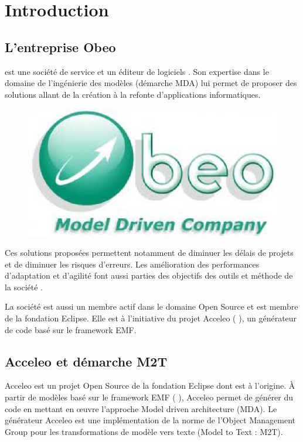 \chapter{Introduction}\label{chap:Intro}

\section{L'entreprise Obeo}
\kwobeo{} est une société de service et un éditeur de logiciels \cite{obeo}. Son expertise dans le domaine de l'ingénierie des modèles (démarche MDA) lui permet de proposer des solutions allant de la création à la refonte d'applications informatiques. 

\begin{figure}[htb]
  \centering
  \includegraphics[scale=.4]{img/logoobeo.eps}
  \label{fig:obeo}
\end{figure}

Ces solutions proposées permettent notamment de diminuer les délais de projets et de diminuer les risques d'erreurs. Les amélioration des performances d'adaptation et d'agilité font aussi parties des objectifs des outils et méthode de la société \kwobeo{}.

La société \kwobeo{} est aussi un membre actif dans le domaine Open Source et est membre de la fondation Eclipse. Elle est à l'initiative du projet Acceleo (\cf{} \cite{acceleo}), un générateur de code basé sur le framework EMF. 


\section{Acceleo et démarche M2T}
Acceleo est un projet Open Source de la fondation Eclipse dont \kwobeo{} est à l'origine. À partir de modèles basé sur le framework EMF (\cf{} \cite{emf}), Acceleo permet de générer du code en mettant en œuvre l'approche Model driven architecture (MDA). Le générateur Acceleo est une implémentation de la norme de l'Object Management Group \cite{omg} pour les transformations de modèle vers texte (Model to Text : M2T).


